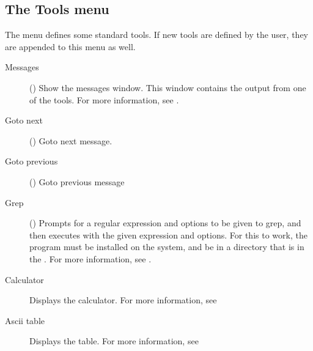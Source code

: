 \subsection{The Tools menu}
\label{se:menutools}
The  menu defines some standard tools. If new tools are defined by the
user, they are appended to this menu as well.
\begin{description}
\item[Messages] () Show the messages window.
This window contains the output from one of the tools. For more information,
see .
\item[Goto next] () Goto next message.
\item[Goto previous] () Goto previous message
\item[Grep] () Prompts for a regular expression and options
to be given to grep, and then executes  with the given expression and
options. For this to work, the  program must be installed on the
system, and be in a directory that is in the . For more
information, see .
\item[Calculator]
Displays the calculator. For more information, see 
\item[Ascii table] Displays the  table. For more information, see
\end{description}
%
%
